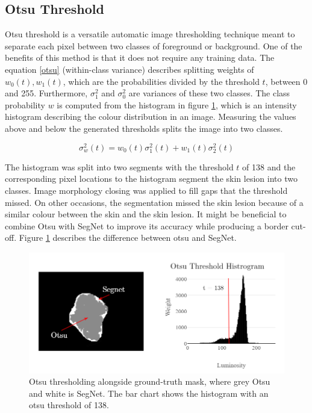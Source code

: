 \subsection{Otsu Threshold}
Otsu threshold is a versatile automatic image thresholding technique meant to separate each pixel between two classes of foreground or background. One of the benefits of this method is that it does not require any training data. The equation \ref{otsu} (within-class variance) describes splitting weights of $w_0(t),w_1(t)$, which are the probabilities divided by the threshold $t$, between 0 and 255. Furthermore, $\sigma_1^2$ and $\sigma_0^2$ are variances of these two classes. The class probability $w$ is computed from the histogram in figure \ref{otsu2}, which is an intensity histogram describing the colour distribution in an image. Measuring the values above and below the generated thresholds splits the image into two classes.

\begin{equation}
\sigma_w^2(t) = w_0(t)\sigma_1^2(t) + w_1(t)\sigma_2^2(t)
\end{equation}\label{otsu}

The histogram was split into two segments with the threshold $t$ of 138 and the corresponding pixel locations to the histogram segment the skin lesion into two classes. Image morphology closing was applied to fill gaps that the threshold missed. On other occasions, the segmentation missed the skin lesion because of a similar colour between the skin and the skin lesion. It might be beneficial to combine Otsu with SegNet to improve its accuracy while producing a border cut-off. Figure \ref{otsu2} describes the difference between otsu and SegNet.

\begin{figure}
\centering
\includegraphics[scale=0.7]{images/otsu3.png}
\caption{Otsu thresholding alongside ground-truth mask, where grey Otsu and white is SegNet. The bar chart shows the histogram with an otsu threshold of 138.}\label{otsu2}
\end{figure}


